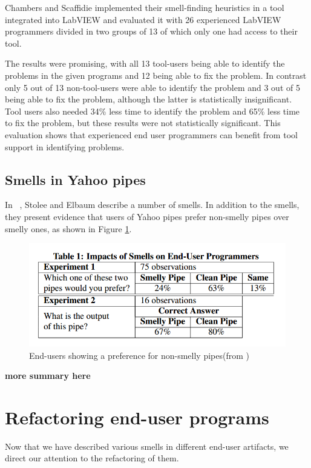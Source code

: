 \documentclass[10pt,conference,compsocconf]{IEEEtran}
\newcommand{\todo}[1]{\textbf{#1}}
\begin{document}
Chambers and Scaffidie implemented their smell-finding heuristics in a tool integrated into LabVIEW and evaluated it with 26 experienced LabVIEW programmers divided in two groups of 13 of which only one had access to their tool.

The results were promising, with all 13 tool-users being able to identify the problems in the given programs and 12 being able to fix the problem.
In contrast only 5 out of 13 non-tool-users were able to identify the problem and 3 out of 5 being able to fix the problem, although the latter is statistically insignificant.
Tool users also needed 34\% less time to identify the problem and 65\% less time to fix the problem, but these results were not statistically significant.
This evaluation shows that experienced end user programmers can benefit from tool support in identifying problems.


\subsection{Smells in Yahoo pipes}
In ~\cite{Stolee2011}, Stolee and Elbaum describe a number of smells. In addition to the smells, they present evidence that users of Yahoo pipes prefer non-smelly pipes over smelly ones, as shown in Figure \ref{fig:Table1-Stolee2011}.

\begin{figure}[ht!]
\centering
\includegraphics[width=\columnwidth]{Table1-Stolee2011.png}
\caption{End-users showing a preference for non-smelly pipes(from \cite{Stolee2011})}
\label{fig:Table1-Stolee2011}
\end{figure}

\todo{more summary here}

\section{Refactoring end-user programs}
\label{sec:refactoring}
Now that we have described various smells in different end-user artifacts, we direct our attention to the refactoring of them. 
\end{document}
